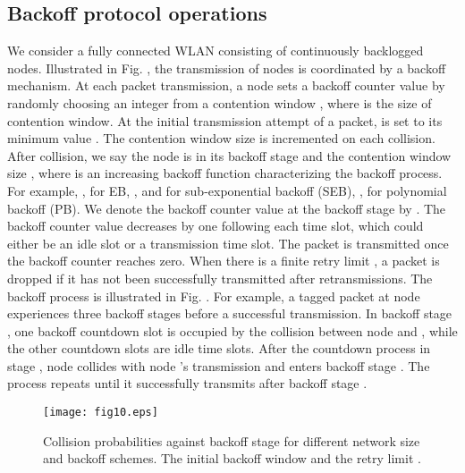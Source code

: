 \documentclass[journal]{IEEEtran}
\begin{document}
\subsection{Backoff protocol operations}
We consider a fully connected WLAN consisting of  continuously backlogged nodes. Illustrated in Fig. , the transmission of  nodes is coordinated by a backoff mechanism. At each packet transmission, a node sets a backoff counter value  by randomly choosing an integer from a contention window , where  is the size of contention window. At the initial transmission attempt of a packet,  is set to its minimum value . The contention window size is incremented on each collision. After  collision, we say the node is in its  backoff stage and the contention window size , where  is an increasing backoff function characterizing the backoff process. For example, ,  for EB, ,  and  for sub-exponential backoff (SEB), ,  for polynomial backoff (PB). We denote the backoff counter value at the  backoff stage by . The backoff counter value decreases by one following each time slot, which could either be an idle slot or a transmission time slot. The packet is transmitted once the backoff counter reaches zero. When there is a finite retry limit , a packet is dropped if it has not been successfully transmitted after  retransmissions. The backoff process is illustrated in Fig. . For example, a tagged packet at node  experiences three backoff stages before a successful transmission. In backoff stage , one backoff countdown slot is occupied by the collision between node  and , while the other countdown slots are idle time slots. After the countdown process in stage , node  collides with node 's transmission and enters backoff stage . The process repeats until it successfully transmits after backoff stage .

\begin{figure}
\centering
  \begin{center}
    \texttt{[image: fig10.eps]}
  \end{center}
  \caption{Collision probabilities against backoff stage for different network size  and backoff schemes. The initial backoff window  and the retry limit .}
  \label{60}
\end{figure}
\end{document}
